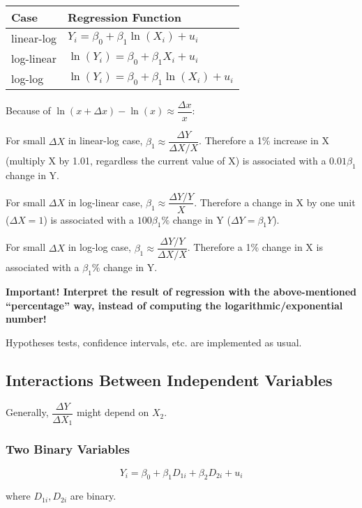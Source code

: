 \documentclass{article}
\begin{document}
\renewcommand{\arraystretch}{1.5}
\begin{table}[H]
	\centering
	\begin{tabular}{ll}
		Case       & Regression Function                           \\ \hline
		linear-log & $Y_i = \beta_0 + \beta_1 \ln(X_i) + u_i$      \\
		log-linear & $\ln(Y_i) = \beta_0 + \beta_1 X_i + u_i$      \\
		log-log    & $\ln(Y_i) = \beta_0 + \beta_1 \ln(X_i) + u_i$
	\end{tabular}
\end{table}
\renewcommand{\arraystretch}{1}

Because of $\ln(x + \Delta x) - \ln(x) \approx \dfrac{\Delta x}{x}$:

For small $\Delta X$ in linear-log case,
$\beta_1 \approx \dfrac{\Delta Y}{\Delta X / X}$.
Therefore a 1\% increase in X (multiply X by 1.01, regardless the current value of X)
is associated with a $0.01\beta_1$ change in Y.

For small $\Delta X$ in log-linear case,
$\beta_1 \approx \dfrac{\Delta Y / Y}{X}$.
Therefore a change in X by one unit ($\Delta X = 1$)
is associated with a $100\beta_1 \%$ change in Y ($\Delta Y = \beta_1 Y$).

For small $\Delta X$ in log-log case,
$\beta_1 \approx \dfrac{\Delta Y / Y}{\Delta X / X}$.
Therefore a 1\% change in X is associated with a $\beta_1\%$ change in Y.

\textbf{Important! Interpret the result of regression with the above-mentioned
``percentage'' way, instead of computing the logarithmic/exponential number!}

Hypotheses tests, confidence intervals, etc. are implemented as usual.

\subsection{Interactions Between Independent Variables}

Generally, $\dfrac{\Delta Y}{\Delta X_1}$ might depend on $X_2$.

\subsubsection{Two Binary Variables}

\[
	Y_i = \beta_0 + \beta_1 D_{1i} + \beta_2 D_{2i} + u_i
\]

where $D_{1i}, D_{2i}$ are binary.
\end{document}

